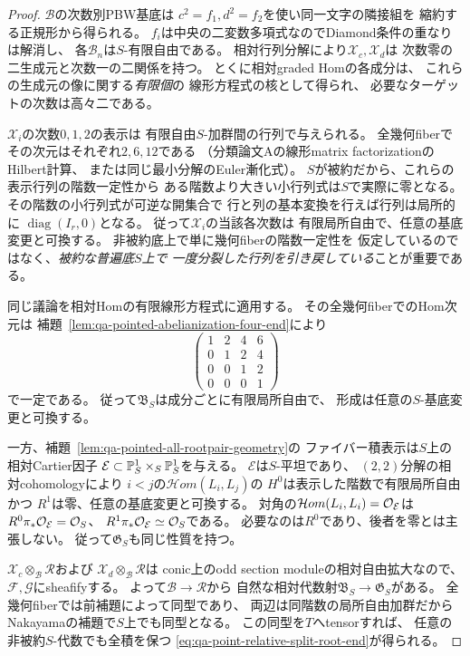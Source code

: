 \begin{proof}
$\mathcal B$の次数別PBW基底は
$c^2=f_1,d^2=f_2$を使い同一文字の隣接組を
縮約する正規形から得られる。
$f_i$は中央の二変数多項式なのでDiamond条件の重なりは解消し、
各$\mathcal B_n$は$S$-有限自由である。
相対行列分解により$\mathcal X_c,\mathcal X_d$は
次数零の二生成元と次数一の二関係を持つ。
とくに相対graded Homの各成分は、
これらの生成元の像に関する\emph{有限個}の
線形方程式の核として得られ、
必要なターゲットの次数は高々二である。

$\mathcal X_i$の次数$0,1,2$の表示は
有限自由$S$-加群間の行列で与えられる。
全幾何fiberでその次元はそれぞれ$2,6,12$である
（分類論文Aの線形matrix factorizationのHilbert計算、
または同じ最小分解のEuler漸化式）。
$S$が被約だから、これらの表示行列の階数一定性から
ある階数より大きい小行列式は$S$で実際に零となる。
その階数の小行列式が可逆な開集合で
行と列の基本変換を行えば行列は局所的に
$\operatorname{diag}(I_r,0)$となる。
従って$\mathcal X_i$の当該各次数は
有限局所自由で、任意の基底変更と可換する。
非被約底上で単に幾何fiberの階数一定性を
仮定しているのではなく、\emph{被約な普遍底$S$上で
一度分裂した行列を引き戻している}ことが重要である。

同じ議論を相対Homの有限線形方程式に適用する。
その全幾何fiberでのHom次元は
補題~\ref{lem:qa-pointed-abelianization-four-end}により
\[
 \begin{pmatrix}
 1&2&4&6\\0&1&2&4\\0&0&1&2\\0&0&0&1
 \end{pmatrix}
\]
で一定である。
従って$\mathfrak B_S$は成分ごとに有限局所自由で、
形成は任意の$S$-基底変更と可換する。

一方、補題~\ref{lem:qa-pointed-all-rootpair-geometry}の
ファイバー積表示は$S$上の相対Cartier因子
$\mathcal E\subset\mathbb P^1_S\times_S\mathbb P^1_S$を与える。
$\mathcal E$は$S$-平坦であり、
$(2,2)$分解の相対cohomologyにより
$i<j$の$\mathcal Hom(L_i,L_j)$の
$H^0$は表示した階数で有限局所自由かつ
$R^1$は零、任意の基底変更と可換する。
対角の$\mathcal Hom(L_i,L_i)=\mathcal O_{\mathcal E}$は
$R^0\pi_*\mathcal O_{\mathcal E}=\mathcal O_S$、
$R^1\pi_*\mathcal O_{\mathcal E}\simeq\mathcal O_S$である。
必要なのは$R^0$であり、後者を零とは主張しない。
従って$\mathfrak G_S$も同じ性質を持つ。

$\mathcal X_c\otimes_{\mathcal B}\mathcal R$および
$\mathcal X_d\otimes_{\mathcal B}\mathcal R$は
conic上のodd section moduleの相対自由拡大なので、
$\mathcal F,\mathcal G$にsheafifyする。
よって$\mathcal B\to\mathcal R$から
自然な相対代数射$\mathfrak B_S\to\mathfrak G_S$がある。
全幾何fiberでは前補題によって同型であり、
両辺は同階数の局所自由加群だから
Nakayamaの補題で$S$上でも同型となる。
この同型を$T$へtensorすれば、
任意の非被約$S$-代数でも全積を保つ
\eqref{eq:qa-point-relative-split-root-end}が得られる。
\end{proof}

